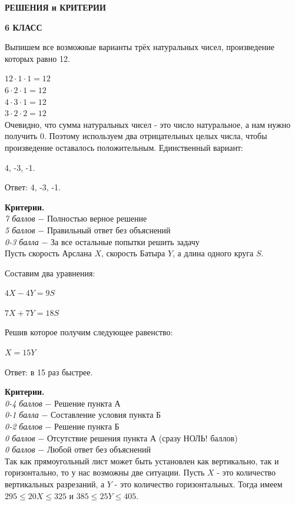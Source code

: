 \centerline{\bf \Large  РЕШЕНИЯ и КРИТЕРИИ}

\centerline{\bf \Large  6 КЛАСС}

 Выпишем все возможные варианты трёх натуральных чисел, произведение которых равно 12.

$12\cdot1\cdot1=12$\\
$6\cdot2\cdot1=12$\\
$4\cdot3\cdot1=12$\\
$3\cdot2\cdot2=12$\\

Очевидно, что сумма натуральных чисел - это число натуральное, а нам нужно получить 0. Поэтому используем два отрицательных целых числа, чтобы произведение оставалось положительным. Единственный вариант:

4, -3, -1.

Ответ: 4, -3, -1.
\par

\textbf{Критерии.} \\
\textit{7 баллов} $-$ Полностью верное решение\\
\textit{5 баллов} $-$ Правильный ответ без объяснений\\
\textit{0-3 балла} $-$  За все остальные попытки решить задачу\\



 Пусть скорость Арслана $X$, скорость Батыра $Y$, а длина одного круга $S$.

Составим два уравнения:

$4X-4Y=9S$

$7X+7Y=18S$

Решив которое получим следующее равенство:

$X=15Y$

Ответ: в 15 раз быстрее.
\par

\textbf{Критерии.} \\
\textit{0-4 баллов} $-$ Решение пункта А\\
\textit{0-1 балла} $-$ Составление условия пункта Б \\
\textit{0-2 баллов} $-$ Решение пункта Б\\
\textit{0 баллов} $-$ Отсутствие решения пункта А (сразу НОЛЬ! баллов)\\
\textit{0 баллов} $-$ Любой ответ без объяснений\\

 Так как прямоугольный лист может быть установлен как вертикально, так и горизонтально, то у нас возможны две ситуации. Пусть $X$ - это количество вертикальных разрезаний, а $Y$ - это количество горизонтальных. Тогда имеем $295	\leqslant 20X 	\leqslant 325$ и $385	\leqslant 25Y 	\leqslant 405$. 

